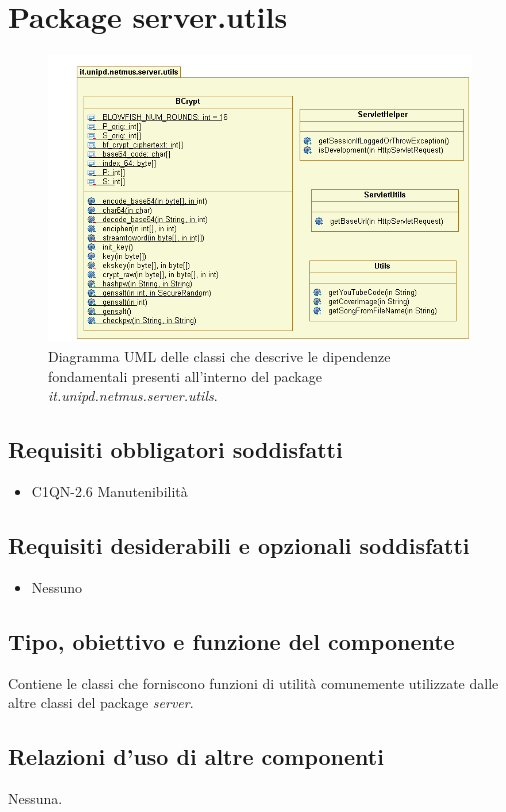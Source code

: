 \newpage
\section{Package server.utils} %

\begin{figure}[!h]
  \centering
  \includegraphics[width=12cm]{img/DP/classes_server_utils.png}
\caption{Diagramma UML delle classi che descrive le dipendenze
fondamentali presenti all'interno del package
\emph{it.unipd.netmus.server.utils}.}
\end{figure}

\subsection*{Requisiti obbligatori soddisfatti}
\begin{itemize}
    \item C1QN-2.6 Manutenibilit\`a
\end{itemize}
\subsection*{Requisiti desiderabili e opzionali soddisfatti}
\begin{itemize}
    \item Nessuno
\end{itemize}
\subsection*{Tipo, obiettivo e funzione del componente}
Contiene le classi che forniscono funzioni di utilit\`a comunemente utilizzate
dalle altre classi del package \emph{server}.
\subsection*{Relazioni d'uso di altre componenti}
Nessuna.
